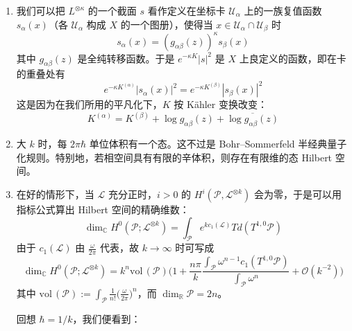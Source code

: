 \begin{enumerate}
  \item 我们可以把 $L^{\otimes\kappa}$ 的一个截面 $s$ 看作定义在坐标卡 $\mathcal{U}_\alpha$ 上的一族复值函数 $s_\alpha(x)$（各 $\mathcal{U}_\alpha$ 构成 $X$ 的一个图册），使得当 $x\in\mathcal{U}_\alpha\cap\mathcal{U}_\beta$ 时
  \begin{equation}
    s_\alpha(x)=(g_{\alpha\beta}(z))^\kappa s_\beta(x)
    \tag{B.21}
    \label{eq:B.21}
  \end{equation}
  其中 $g_{\alpha\beta}(z)$ 是全纯转移函数。于是 $e^{-\kappa K}|s|^2$ 是 $X$ 上良定义的函数，即在卡的重叠处有
  \begin{equation}
    e^{-\kappa K^{(\alpha)}}|s_\alpha(x)|^2=e^{-\kappa K^{(\beta)}}|s_\beta(x)|^2
    \tag{B.22}
    \label{eq:B.22}
  \end{equation}
  这是因为在我们所用的平凡化下，$K$ 按 Kähler 变换改变：
  \begin{equation}
    K^{(\alpha)}=K^{(\beta)}+\log g_{\alpha\beta}(z)+\overline{\log g_{\alpha\beta}(z)}
    \tag{B.23}
    \label{eq:B.23}
  \end{equation}

  \item 大 $k$ 时，每 $2\pi\hbar$ 单位体积有一个态。这不过是 Bohr--Sommerfeld 半经典量子化规则。特别地，若相空间具有有限的辛体积，则存在有限维的态 Hilbert 空间。

  \item 在好的情形下，当 $\mathcal{L}$ 充分正时，$i>0$ 的 $H^i(\mathcal{P},\mathcal{L}^{\otimes k})$ 会为零，于是可以用指标公式算出 Hilbert 空间的精确维数：
  \begin{equation}
    \dim_{\mathbb{C}}H^0(\mathcal{P};\mathcal{L}^{\otimes k})=\int_{\mathcal{P}}e^{kc_1(\mathcal{L})}Td(T^{1,0}\mathcal{P})
    \tag{B.24}
    \label{eq:B.24}
  \end{equation}
  由于 $c_1(\mathcal{L})$ 由 $\frac{\omega}{2\pi}$ 代表，故 $k\to\infty$ 时可写成
  \begin{equation}
    \dim_{\mathbb{C}}H^0(\mathcal{P};\mathcal{L}^{\otimes k})
    =k^n\mathrm{vol}\,(\mathcal{P})\Big(1+\frac{n\pi}{k}\frac{\int_{\mathcal{P}}\omega^{n-1}c_1(T^{1,0}\mathcal{P})}{\int_{\mathcal{P}}\omega^n}+\mathcal{O}(k^{-2})\Big)
    \tag{B.25}
    \label{eq:B.25}
  \end{equation}
  其中 $\mathrm{vol}\,(\mathcal{P}):=\int_{\mathcal{P}}\frac{1}{n!}\big(\frac{\omega}{2\pi}\big)^n$，而 $\dim_{\mathbb{R}}\mathcal{P}=2n$。

  回想 $\hbar=1/k$，我们便看到：


\end{enumerate}

